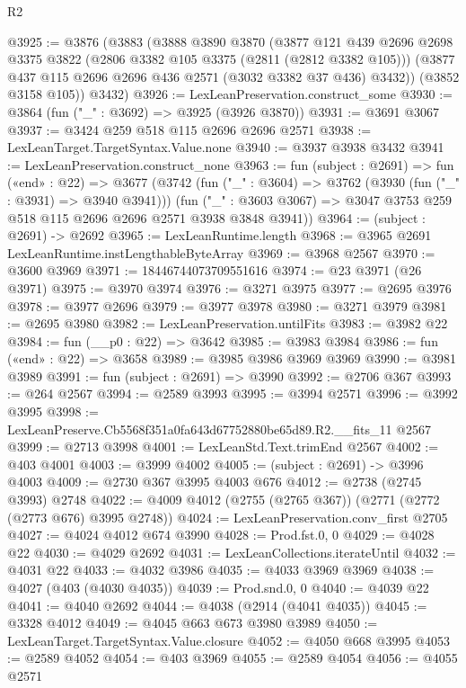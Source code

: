 \begin{lexlean}{R2}
\begin{coremodule}
@3925 := @3876
    (@3883
      (@3888
        @3890
        @3870
        (@3877
          @121
          @439
          @2696
          @2698
          @3375
          @3822
          (@2806 @3382 @105 @3375 (@2811 (@2812 @3382 @105)))
          (@3877 @437 @115 @2696 @2696 @436 @2571 (@3032 @3382 @37 @436) @3432))
        (@3852 @3158 @105))
      @3432)
@3926 := LexLeanPreservation.construct_some
@3930 := @3864 (fun ("_" : @3692) => @3925 (@3926 @3870))
@3931 := @3691 @3067
@3937 := @3424 @259 @518 @115 @2696 @2696 @2571
@3938 := LexLeanTarget.TargetSyntax.Value.none
@3940 := @3937 @3938 @3432
@3941 := LexLeanPreservation.construct_none
@3963 := fun (subject : @2691) =>
  fun («end» : @22) =>
  @3677
    (@3742
      (fun ("_" : @3604) => @3762 (@3930 (fun ("_" : @3931) => @3940 @3941)))
      (fun ("_" : @3603 @3067) => @3047 @3753 @259 @518 @115 @2696 @2696 @2571 @3938 @3848 @3941))
@3964 := (subject : @2691) -> @2692
@3965 := LexLeanRuntime.length
@3968 := @3965 @2691 LexLeanRuntime.instLengthableByteArray
@3969 := @3968 @2567
@3970 := @3600 @3969
@3971 := 18446744073709551616
@3974 := @23 @3971 (@26 @3971)
@3975 := @3970 @3974
@3976 := @3271 @3975
@3977 := @2695 @3976
@3978 := @3977 @2696
@3979 := @3977 @3978
@3980 := @3271 @3979
@3981 := @2695 @3980
@3982 := LexLeanPreservation.untilFits
@3983 := @3982 @22
@3984 := fun (__p0 : @22) => @3642
@3985 := @3983 @3984
@3986 := fun («end» : @22) => @3658
@3989 := @3985 @3986 @3969 @3969
@3990 := @3981 @3989
@3991 := fun (subject : @2691) => @3990
@3992 := @2706 @367
@3993 := @264 @2567
@3994 := @2589 @3993
@3995 := @3994 @2571
@3996 := @3992 @3995
@3998 := LexLeanPreserve.Cb5568f351a0fa643d67752880be65d89.R2.__fits_11 @2567
@3999 := @2713 @3998
@4001 := LexLeanStd.Text.trimEnd @2567
@4002 := @403 @4001
@4003 := @3999 @4002
@4005 := (subject : @2691) -> @3996 @4003
@4009 := @2730 @367 @3995 @4003 @676
@4012 := @2738 (@2745 @3993) @2748
@4022 := @4009 @4012 (@2755 (@2765 @367)) (@2771 (@2772 (@2773 @676) @3995 @2748))
@4024 := LexLeanPreservation.conv_first @2705
@4027 := @4024 @4012 @674 @3990
@4028 := Prod.fst.{0, 0}
@4029 := @4028 @22
@4030 := @4029 @2692
@4031 := LexLeanCollections.iterateUntil
@4032 := @4031 @22
@4033 := @4032 @3986
@4035 := @4033 @3969 @3969
@4038 := @4027 (@403 (@4030 @4035))
@4039 := Prod.snd.{0, 0}
@4040 := @4039 @22
@4041 := @4040 @2692
@4044 := @4038 (@2914 (@4041 @4035))
@4045 := @3328 @4012
@4049 := @4045 @663 @673 @3980 @3989
@4050 := LexLeanTarget.TargetSyntax.Value.closure
@4052 := @4050 @668 @3995
@4053 := @2589 @4052
@4054 := @403 @3969
@4055 := @2589 @4054
@4056 := @4055 @2571

\end{coremodule}
\end{lexlean}

